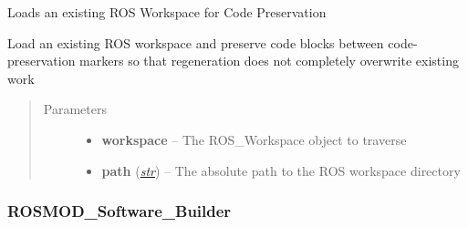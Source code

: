 \documentclass[letterpaper,10pt,english]{sphinxmanual}
\begin{document}
\begin{fulllineitems}
\label{class_Loader:ROSMOD_Loader}
Loads an existing ROS Workspace for Code Preservation

\begin{fulllineitems}
\label{class_Loader:ROSMOD_Loader.load}
Load an existing ROS workspace and preserve code blocks between code-preservation markers so that regeneration does not completely overwrite existing work
\begin{quote}\begin{description}
\item[{Parameters}] \leavevmode\begin{itemize}
\item {} 
\textbf{workspace} -- The ROS\_Workspace object to traverse

\item {} 
\textbf{path} (\href{http://docs.python.org/library/functions.html\#str}{\emph{str}}) -- The absolute path to the ROS workspace directory

\end{itemize}

\end{description}\end{quote}

\end{fulllineitems}


\end{fulllineitems}



\subsubsection{ROSMOD\_Software\_Builder}
\label{class_Software_Builder::doc}\label{class_Software_Builder:rosmod-software-builder}
\end{document}

